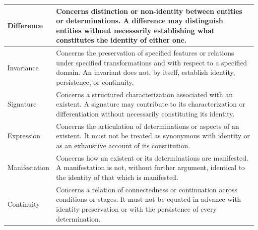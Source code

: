 \begin{table}[htbp]
\begin{tabular}{|p{}|p{}|}
Difference
&
Concerns distinction or non-identity between
entities or determinations. A difference may
distinguish entities without necessarily
establishing what constitutes the identity
of either one.
\\
\hline

Invariance
&
Concerns the preservation of specified features
or relations under specified transformations
and with respect to a specified domain. An
invariant does not, by itself, establish
identity, persistence, or continuity.
\\
\hline

Signature
&
Concerns a structured characterization associated
with an existent. A signature may contribute
to its characterization or differentiation
without necessarily constituting its identity.
\\
\hline

Expression
&
Concerns the articulation of determinations
or aspects of an existent. It must not be
treated as synonymous with identity or as
an exhaustive account of its constitution.
\\
\hline

Manifestation
&
Concerns how an existent or its determinations
are manifested. A manifestation is not,
without further argument, identical to the
identity of that which is manifested.
\\
\hline

Continuity
&
Concerns a relation of connectedness or
continuation across conditions or stages.
It must not be equated in advance with
identity preservation or with the persistence
of every determination.
\\
\hline

\end{tabular}

\end{table}

